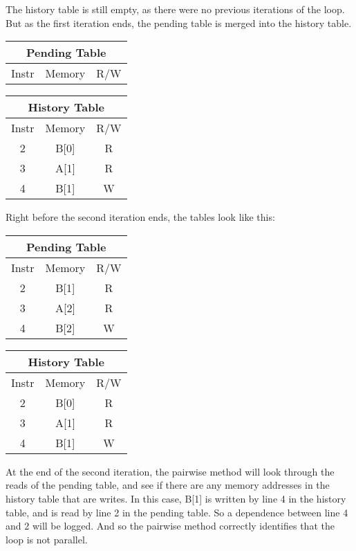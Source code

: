 \documentclass[12pt,twoside]{reedthesis}
\begin{document}
		The history table is still empty, as there were no previous iterations of the loop. But as the first iteration ends, the pending table is merged into the history table. 
		
		
		\begin{tabular}{ |c|c|c| } 
			\hline
			\multicolumn{3}{|c|}{Pending Table} \\
			\hline
			Instr & Memory & R/W \\ 
			\hline
			\hline
		\end{tabular}
		\begin{tabular}{ |c|c|c| } 
			\hline
			\multicolumn{3}{|c|}{History Table} \\
			\hline
			Instr & Memory & R/W \\ 
			\hline
			2 & B[0] & R \\ 
			3 & A[1] & R \\ 
			4 & B[1] & W \\ 
			\hline
		\end{tabular}
	
		Right before the second iteration ends, the tables look like this:
			
		\begin{tabular}{ |c|c|c| } 
			\hline
			\multicolumn{3}{|c|}{Pending Table} \\
			\hline
			Instr & Memory & R/W \\ 
			\hline
			2 & B[1] & R \\ 
			3 & A[2] & R \\ 
			4 & B[2] & W \\ 
			\hline
		\end{tabular}
		\begin{tabular}{ |c|c|c| } 
			\hline
			\multicolumn{3}{|c|}{History Table} \\
			\hline
			Instr & Memory & R/W \\ 
			\hline
			2 & B[0] & R \\ 
			3 & A[1] & R \\ 
			4 & B[1] & W \\ 
			\hline
		\end{tabular}
	
		At the end of the second iteration, the pairwise method will look through the reads of the pending table, and see if there are any memory addresses in the history table that are writes. In this case, B[1] is written by line 4 in the history table, and is read by line 2 in the pending table. So a dependence between line 4 and 2 will be logged. And so the pairwise method correctly identifies that the loop is not parallel. 
		
\end{document}
